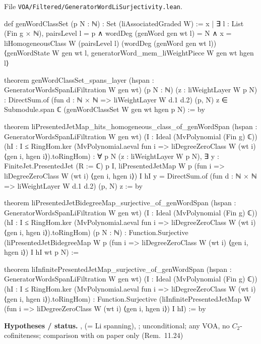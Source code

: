 \documentclass[11pt,openany]{book}
\newcommand{\lean}[1]{\texttt{\detokenize{#1}}}
\newcommand{\leanpath}[1]{\texttt{\small #1}}
\theoremstyle{definition}
\theoremstyle{plain}
\begin{document}
{\raggedright\noindent File \leanpath{VOA/\allowbreak Filtered/\allowbreak GeneratorWordLiSurjectivity.lean}.\par}
\begin{leancode}
def genWordClassSet (p N : ℕ) : Set (liAssociatedGraded W) :=
  {x | ∃ l : List (Fin g × ℕ),
      pairsLevel l = p ∧ wordDeg (genWord gen wt l) = N ∧
      x = liHomogeneousClass W (pairsLevel l) (wordDeg (genWord gen wt l))
        ⟨genWordState W gen wt l, generatorWord_mem_liWeightPiece W gen wt hgen l⟩}

theorem genWordClassSet_spans_layer (hspan : GeneratorWordsSpanLiFiltration W gen wt)
    (p N : ℕ) (z : liWeightLayer W p N) :
    DirectSum.of (fun d : ℕ × ℕ => liWeightLayer W d.1 d.2) (p, N) z ∈
      Submodule.span ℂ (genWordClassSet W gen wt hgen p N) := by

theorem liPresentedJetMap_hits_homogeneous_class_of_genWordSpan
    (hspan : GeneratorWordsSpanLiFiltration W gen wt)
    (I : Ideal (MvPolynomial (Fin g) ℂ))
    (hI : I ≤ RingHom.ker
      (MvPolynomial.aeval fun i => liDegreeZeroClass W (wt i) ⟨gen i, hgen i⟩).toRingHom) :
    ∀ p N (z : liWeightLayer W p N),
      ∃ y : FiniteJet.PresentedJet (R := ℂ) p I,
        liPresentedJetMap W p (fun i => liDegreeZeroClass W (wt i) ⟨gen i, hgen i⟩) I hI y =
          DirectSum.of (fun d : ℕ × ℕ => liWeightLayer W d.1 d.2) (p, N) z := by

theorem liPresentedJetBidegreeMap_surjective_of_genWordSpan
    (hspan : GeneratorWordsSpanLiFiltration W gen wt)
    (I : Ideal (MvPolynomial (Fin g) ℂ))
    (hI : I ≤ RingHom.ker
      (MvPolynomial.aeval fun i => liDegreeZeroClass W (wt i) ⟨gen i, hgen i⟩).toRingHom)
    (p N : ℕ) :
    Function.Surjective
      (liPresentedJetBidegreeMap W p (fun i => liDegreeZeroClass W (wt i) ⟨gen i, hgen i⟩)
        I hI wt p N) :=

theorem liInfinitePresentedJetMap_surjective_of_genWordSpan
    (hspan : GeneratorWordsSpanLiFiltration W gen wt)
    (I : Ideal (MvPolynomial (Fin g) ℂ))
    (hI : I ≤ RingHom.ker
      (MvPolynomial.aeval fun i => liDegreeZeroClass W (wt i) ⟨gen i, hgen i⟩).toRingHom) :
    Function.Surjective
      (liInfinitePresentedJetMap W (fun i => liDegreeZeroClass W (wt i) ⟨gen i, hgen i⟩) I hI) := by
\end{leancode}
\noindent\textbf{Hypotheses / status.} \lean{hgen}, \lean{hspan} (= Li spanning), \lean{hI}; unconditional; any VOA, no $C_2$-cofiniteness; comparison with \lean{hdec} on paper only (Rem.~11.24)\par
\end{document}

